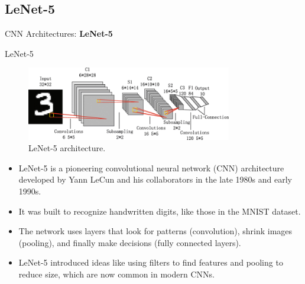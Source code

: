 \subsection{LeNet-5}
\begin{frame}{}
    \LARGE CNN Architectures: \textbf{LeNet-5}
\end{frame}

\begin{frame}{LeNet-5}
    \begin{figure}
        \centering
        \includegraphics[width=0.8\textwidth,height=0.4\textheight,keepaspectratio]{images/cnn/lenet5.png}
        \caption*{LeNet-5 architecture.}
    \end{figure}
    {\small
        \begin{itemize}
            \item LeNet-5 is a pioneering convolutional neural network (CNN) architecture developed by Yann LeCun and his collaborators in the late 1980s and early 1990s.
            \item It was built to recognize handwritten digits, like those in the MNIST dataset.
            \item The network uses layers that look for patterns (convolution), shrink images (pooling), and finally make decisions (fully connected layers).
            \item LeNet-5 introduced ideas like using filters to find features and pooling to reduce size, which are now common in modern CNNs.
        \end{itemize}
    }
\end{frame}